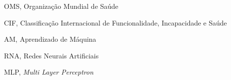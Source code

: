 \begin{siglas}
  \item OMS, Organização Mundial de Saúde
  \item CIF, Classificação Internacional de Funcionalidade, Incapacidade e Saúde
  \item AM, Aprendizado de Máquina
  \item RNA, Redes Neurais Artificiais
  \item MLP, \textit{Multi Layer Perceptron}
\end{siglas}
